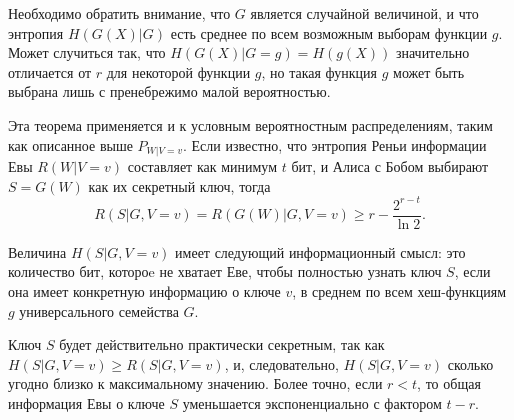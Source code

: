 Необходимо обратить внимание, что $G$ является случайной величиной, и что энтропия $H(G(X)|G)$ есть среднее по всем возможным выборам функции $g$. Может случиться так, что $H(G(X)|G=g) = H(g(X))$ значительно отличается от $r$ для некоторой функции $g$, но такая функция $g$ может быть выбрана лишь с пренебрежимо малой вероятностью.

Эта теорема применяется и к условным вероятностным распределениям, таким как описанное выше $P_{W|V=v}$. Если известно, что энтропия Реньи информации Евы $R(W|V=v)$ составляет как минимум $t$ бит, и Алиса с Бобом выбирают $S = G(W)$ как их секретный ключ, тогда
\begin{equation}
  R(S|G,V=v) = R(G(W)|G,V=v) \geq r - \frac{2^{r - t}}{\ln 2}.
\end{equation}

Величина $H(S|G,V=v)$ имеет следующий информационный смысл: это количество бит, котороe не хватает Еве, чтобы полностью узнать ключ $S$, если она имеет конкретную информацию о ключе $v$, в среднем по всем хеш-функциям $g$ универсального семейства $G$.

Ключ $S$ будет действительно практически секретным, так как $H(S|G,V=v) \geq R(S|G,V=v)$, и, следовательно, $H(S|G,V=v)$ сколько угодно близко к максимальному значению. Более точно, если $r < t$, то общая информация Евы о ключе $S$ уменьшается экспоненциально с фактором $t-r$.





